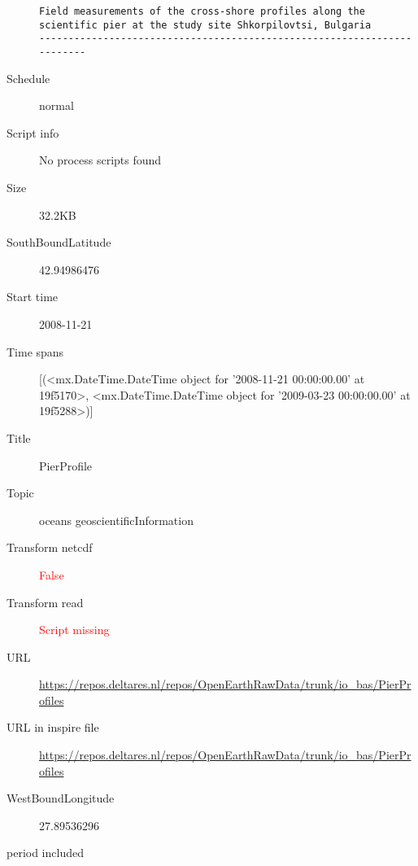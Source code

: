 \documentclass[9]{report}
\begin{document}
\begin{description}
\begin{verbatim}
Field measurements of the cross-shore profiles along the scientific pier at the study site Shkorpilovtsi, Bulgaria
------------------------------------------------------------------------

\end{verbatim}
  \item[Schedule] normal
  \item[Script info] No process scripts found
  \item[Size] 32.2KB
  \item[SouthBoundLatitude] 42.94986476
  \item[Start time] 2008-11-21
  \item[Time spans] [(<mx.DateTime.DateTime object for '2008-11-21 00:00:00.00' at 19f5170>, <mx.DateTime.DateTime object for '2009-03-23 00:00:00.00' at 19f5288>)]
  \item[Title]  PierProfile 
  \item[Topic] oceans geoscientificInformation
  \item[Transform netcdf] \textcolor{red}{False}
  \item[Transform read] \textcolor{red}{Script missing}
  \item[URL] \href{https://repos.deltares.nl/repos/OpenEarthRawData/trunk/io\_bas/PierProfiles}{https://repos.deltares.nl/repos/OpenEarthRawData/trunk/io\_bas/PierProfiles}
  \item[URL in inspire file] \href{https://repos.deltares.nl/repos/OpenEarthRawData/trunk/io\_bas/PierProfiles}{https://repos.deltares.nl/repos/OpenEarthRawData/trunk/io\_bas/PierProfiles}
  \item[WestBoundLongitude] 27.89536296
  \item[period included] 
\end{description}
\end{document}
